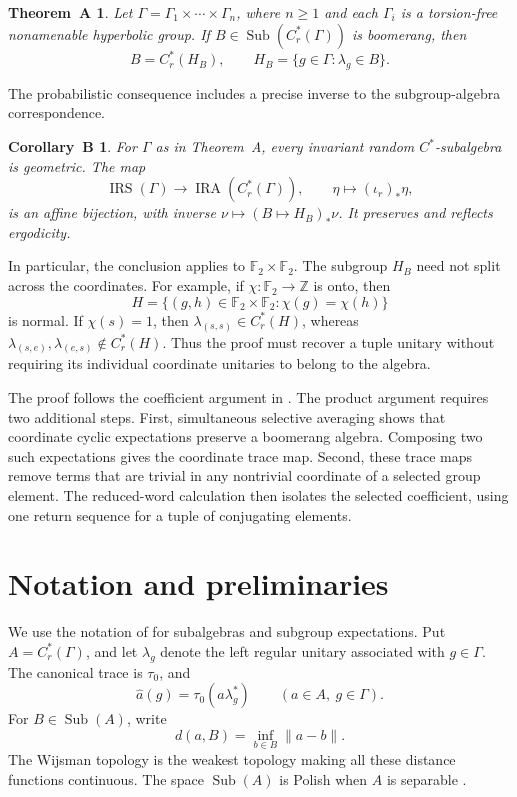 \documentclass[11pt,letterpaper]{amsart}
\numberwithin{equation}{section}
\newtheorem*{theoremA}{Theorem~A}
\newtheorem*{corollaryB}{Corollary~B}
\theoremstyle{definition}
\theoremstyle{remark}
\newcommand{\Cr}{C_r^*}
\newcommand{\Sub}{\operatorname{Sub}}
\newcommand{\IRS}{\operatorname{IRS}}
\newcommand{\IRA}{\operatorname{IRA}}
\newcommand{\F}{\mathbb F}
\newcommand{\Z}{\mathbb Z}
\begin{document}
\begin{theoremA}
Let $\Gamma=\Gamma_1\times\cdots\times\Gamma_n$, where $n\ge1$ and each
$\Gamma_i$ is a torsion-free nonamenable hyperbolic group.
If $B\in\Sub(\Cr(\Gamma))$ is boomerang, then
\[
 B=\Cr(H_B),\qquad
 H_B=\{g\in\Gamma:\lambda_g\in B\}.
\]
\end{theoremA}

The probabilistic consequence includes a precise inverse to the
subgroup-algebra correspondence.

\begin{corollaryB}
For $\Gamma$ as in Theorem~A, every invariant random $C^*$-subalgebra
is geometric. The map
\[
 \IRS(\Gamma)\longrightarrow\IRA(\Cr(\Gamma)),
 \qquad \eta\longmapsto(\iota_r)_*\eta,
\]
is an affine bijection, with inverse
$\nu\mapsto(B\mapsto H_B)_*\nu$. It preserves and reflects ergodicity.
\end{corollaryB}

In particular, the conclusion applies to $\F_2\times\F_2$.
The subgroup $H_B$ need not split across the coordinates. For example, if
$\chi:\F_2\to\Z$ is onto, then
\[
 H=\{(g,h)\in\F_2\times\F_2:\chi(g)=\chi(h)\}
\]
is normal. If $\chi(s)=1$, then $\lambda_{(s,s)}\in\Cr(H)$, whereas
$\lambda_{(s,e)},\lambda_{(e,s)}\notin\Cr(H)$.
Thus the proof must recover a tuple unitary without requiring its
individual coordinate unitaries to belong to the algebra.

The proof follows the coefficient argument in
\cite[Lemmas~6.5--6.7 and Theorem 6.8]{FOT}.
The product argument requires two additional steps. First, simultaneous
selective averaging \cite[Theorem~3.3]{AJ} shows that coordinate cyclic
expectations preserve a boomerang algebra. Composing two such
expectations gives the coordinate trace map. Second, these trace maps
remove terms that are trivial in any nontrivial coordinate of a selected
group element. The reduced-word calculation then isolates the selected
coefficient, using one return sequence for a tuple of conjugating
elements.

\section{Notation and preliminaries}\label{sec:notation}

We use the notation of \cite{FOT} for subalgebras and subgroup
expectations. Put $A=\Cr(\Gamma)$, and let $\lambda_g$ denote the left
regular unitary associated with $g\in\Gamma$. The canonical trace is
$\tau_0$, and
\[
 \widehat a(g)=\tau_0(a\lambda_g^*)\qquad(a\in A,\ g\in\Gamma).
\]
For $B\in\Sub(A)$, write
\[
 d(a,B)=\inf_{b\in B}\|a-b\|.
\]
The Wijsman topology is the weakest topology making all these distance
functions continuous. The space $\Sub(A)$ is Polish when $A$ is
separable \cite[Theorem~2.3]{FOT}.
\end{document}
